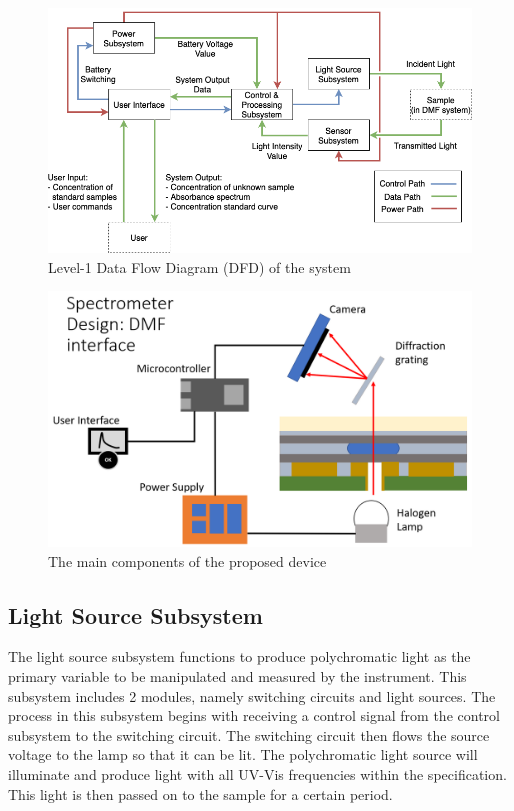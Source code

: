 \documentclass[conference]{IEEEtran}
\begin{document}
    \begin{figure}[htbp]
    \centerline{\includegraphics[scale=0.27]{system-dfd.png}}
    \caption{Level-1 Data Flow Diagram (DFD) of the system}
    \label{system-dfd}
    \end{figure}

    \begin{figure}[htbp]
    \centerline{\includegraphics[scale=0.27]{dmf-hardware-scheme.png}}
    \caption{The main components of the proposed device}
    \label{dmf-hardware-scheme}
    \end{figure}

\subsection{Light Source Subsystem}
The light source subsystem functions to produce polychromatic light as the primary variable to be manipulated and measured by the instrument. This subsystem includes 2 modules, namely switching circuits and light sources. The process in this subsystem begins with receiving a control signal from the control subsystem to the switching circuit. The switching circuit then flows the source voltage to the lamp so that it can be lit. The polychromatic light source will illuminate and produce light with all UV-Vis frequencies within the specification. This light is then passed on to the sample for a certain period.
\end{document}
